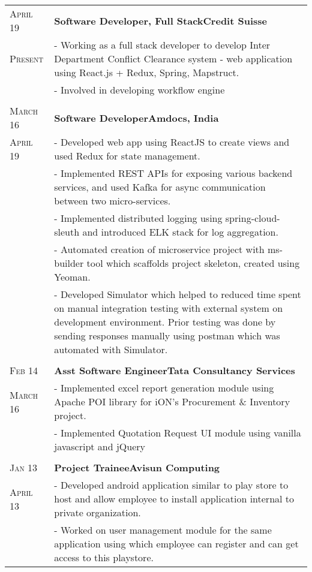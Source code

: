 \documentclass[a4paper,10pt]{extarticle} %
\begin{document}
\begin{tabularx}{\linewidth}{ l | X }

\textsc{April 19} & \textbf{Software Developer, Full Stack}\hfill\textbf{Credit Suisse}\\
\textsc{Present}& {- Working as a full stack developer to develop Inter Department Conflict Clearance system - web application using React.js + Redux, Spring, Mapstruct.}\\
& {- Involved in developing workflow engine}\\

\multicolumn{2}{c}{} \\

\textsc{March 16} & \textbf{Software Developer}\hfill\textbf{Amdocs, India}\\
\textsc{April 19}& {- Developed web app using ReactJS to create views and used Redux for state management.}\\
& {- Implemented REST APIs for exposing various backend services, and used Kafka for async communication between two micro-services.}\\
& {- Implemented distributed logging using spring-cloud-sleuth and introduced ELK stack for log aggregation.}\\
& {- Automated creation of microservice project with ms-builder tool which scaffolds project skeleton, created using Yeoman.}\\
& {- Developed Simulator which helped to reduced time spent on manual integration testing with external system on development environment. Prior testing was done by sending responses manually using postman which was automated with Simulator.}\\

\multicolumn{2}{c}{} \\

\textsc{Feb 14} & \textbf{Asst Software Engineer}\hfill\textbf{Tata Consultancy Services}\\
\textsc{March 16}& {- Implemented excel report generation module using Apache POI library for iON's Procurement \& Inventory project.}\\
& {- Implemented Quotation Request UI module using vanilla javascript and jQuery}\\
\multicolumn{2}{c}{} \\

\textsc{Jan 13} & \textbf{Project Trainee}\hfill\textbf{Avisun Computing}\\
\textsc{April 13} & {- Developed android application similar to play store to host and allow employee to install application internal to private organization.}\\
& {- Worked on user management module for the same application using which employee can register and can get access to this playstore.}\\

\end{tabularx}
\end{document}
